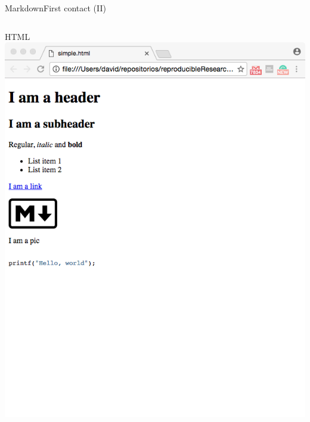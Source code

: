 \documentclass{beamer}
\begin{document}
\begin{frame}[plain]{Markdown}{First contact (II)}
\begin{columns}
     \column{0.3\dimexpr\paperwidth-10pt}
	 	\centering HTML\\
		\includegraphics[height=\linewidth]{figs/html.png} 
  \end{columns}


\end{frame}
\end{document}
